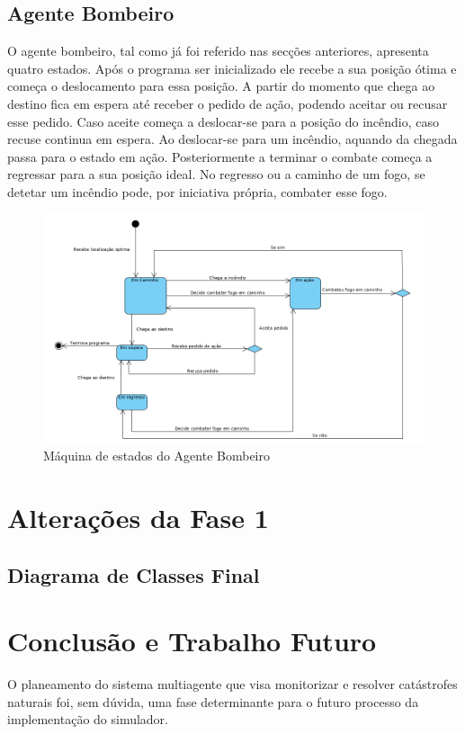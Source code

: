 \documentclass[a4paper]{article}
\begin{document}
\subsection{Agente Bombeiro}
O agente bombeiro, tal como já foi referido nas secções anteriores, apresenta quatro estados. Após o programa ser inicializado ele recebe a sua posição ótima e começa o deslocamento para essa posição. A partir do momento que chega ao destino fica em espera até receber o pedido de ação, podendo aceitar ou recusar esse pedido. Caso aceite começa a deslocar-se para a posição do incêndio, caso recuse continua em espera. Ao deslocar-se para um incêndio, aquando da chegada passa para o estado em ação. Posteriormente a terminar o combate começa a regressar para a sua posição ideal. No  regresso ou a caminho de um fogo, se detetar um incêndio pode, por iniciativa própria, combater esse fogo.
\begin{figure}[H]
    \centering
    \includegraphics[scale=0.45]{Bombeiro.png}
    \caption{Máquina de estados do Agente Bombeiro}
\end{figure}

\pagebreak
\section{Alterações da Fase 1}

\subsection{Diagrama de Classes Final}


\newpage
\section{Conclusão e Trabalho Futuro}
O planeamento do sistema multiagente que visa monitorizar e resolver catástrofes naturais foi, sem dúvida, uma fase determinante para o futuro processo da implementação do simulador.
\end{document}
